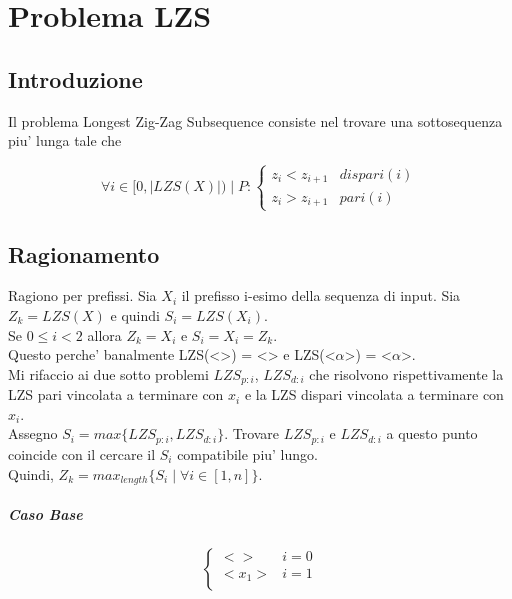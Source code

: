 \chapter{Problema LZS}

\section{Introduzione}

Il problema Longest Zig-Zag Subsequence consiste nel trovare una sottosequenza piu' lunga tale che

\[
    \forall i \in [0, |LZS(X)|) \mid P :
    \begin{cases}
        \text{$z_i < z_{i+1}$} & \text{$dispari(i)$} \\
        \text{$z_i > z_{i+1}$} & \text{$pari(i)$}
    \end{cases}
\]

\section{Ragionamento}

Ragiono per prefissi.
Sia $X_{i}$ il prefisso i-esimo della sequenza di input.
Sia $Z_k = LZS(X)$ e quindi $S_i = LZS(X_{i})$. \\

Se $ 0\leq i < 2$ allora $Z_k = X_{i}$ e $S_i = X_i = Z_k$. \\
Questo perche' banalmente LZS(<>) = <> e LZS(<$\alpha$>) = <$\alpha$>. \\

Mi rifaccio ai due sotto problemi $LZS_{p:i}$, $LZS_{d:i}$ che risolvono rispettivamente
la LZS pari vincolata a terminare con $x_i$ e
la LZS dispari vincolata a terminare con $x_i$. \\

Assegno $S_{i} = max \{ LZS_{p:i}, LZS_{d:i} \}$.
Trovare $LZS_{p:i}$ e $LZS_{d:i}$ a questo punto coincide con il cercare il $S_{i}$ compatibile piu' lungo. \\
Quindi, $Z_k = max_{length} \{ S_{i} \mid \forall i \in [1,n] \}$.

\paragraph{Caso Base}

\[
    \begin{cases}
        \text{$<>$} & \text{$i = 0$} \\
        \text{$<x_1>$} & \text{$i = 1$} \\
    \end{cases}
\]

